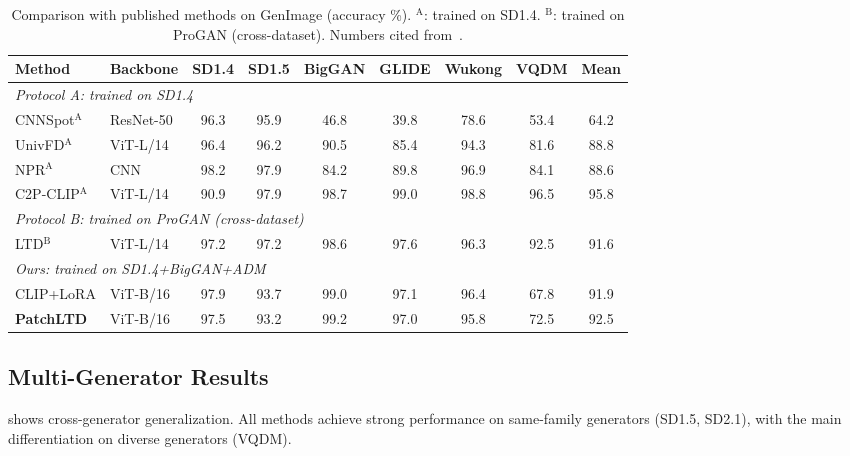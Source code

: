 \documentclass[runningheads]{llncs}
\newcommand{\ours}{PatchLTD}
\begin{document}
\begin{table}[t]
\centering
\caption{Comparison with published methods on GenImage (accuracy \%). $^\text{A}$: trained on SD1.4. $^\text{B}$: trained on ProGAN (cross-dataset). Numbers cited from~\cite{c2pclip2025,yang2026ltd}.}
\label{tab:published}
\setlength{\tabcolsep}{3pt}
\begin{tabular}{llccccccc}
\toprule
Method & Backbone & SD1.4 & SD1.5 & BigGAN & GLIDE & Wukong & VQDM & Mean \\
\midrule
\multicolumn{9}{l}{\textit{Protocol A: trained on SD1.4}} \\
CNNSpot$^\text{A}$~\cite{wang2020cnnspot}    & ResNet-50 & 96.3 & 95.9 & 46.8 & 39.8 & 78.6 & 53.4 & 64.2 \\
UnivFD$^\text{A}$~\cite{ojha2023universalfakedetector} & ViT-L/14  & 96.4 & 96.2 & 90.5 & 85.4 & 94.3 & 81.6 & 88.8 \\
NPR$^\text{A}$~\cite{npr2025}               & CNN       & 98.2 & 97.9 & 84.2 & 89.8 & 96.9 & 84.1 & 88.6 \\
C2P-CLIP$^\text{A}$~\cite{c2pclip2025}      & ViT-L/14  & 90.9 & 97.9 & 98.7 & 99.0 & 98.8 & 96.5 & 95.8 \\
\midrule
\multicolumn{9}{l}{\textit{Protocol B: trained on ProGAN (cross-dataset)}} \\
LTD$^\text{B}$~\cite{yang2026ltd}           & ViT-L/14  & 97.2 & 97.2 & 98.6 & 97.6 & 96.3 & 92.5 & 91.6 \\
\midrule
\multicolumn{9}{l}{\textit{Ours: trained on SD1.4+BigGAN+ADM}} \\
CLIP+LoRA                                    & ViT-B/16  & 97.9 & 93.7 & 99.0 & 97.1 & 96.4 & 67.8 & 91.9 \\
\textbf{\ours{}}                             & ViT-B/16  & 97.5 & 93.2 & 99.2 & 97.0 & 95.8 & 72.5 & 92.5 \\
\bottomrule
\end{tabular}
\end{table}

\subsection{Multi-Generator Results}
\label{sec:multi_gen}

 shows cross-generator generalization.
All methods achieve strong performance on same-family generators (SD1.5, SD2.1), with the main differentiation on diverse generators (VQDM).
\end{document}
